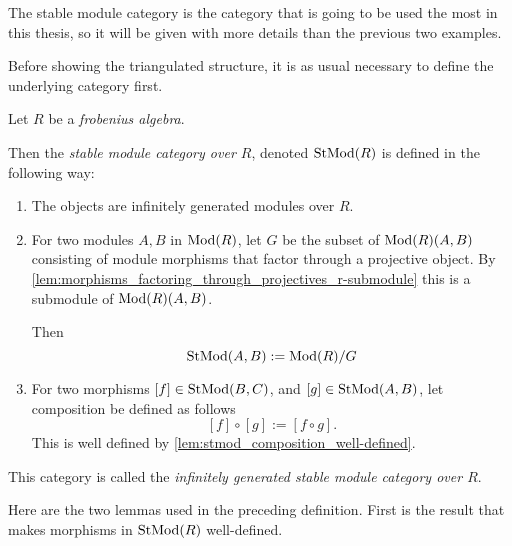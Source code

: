 The stable module category is the category that is going to be used the most in this thesis, so it will be given with more details than the previous two examples.

Before showing the triangulated structure, it is as usual necessary to define the underlying category first.

\begin{definition}
    \label{def:stable_module_category}
    Let \( R \) be a \emph{frobenius algebra}.

    Then the \emph{stable module category over \( R \)}, denoted \( \operatorname{StMod}(R) \) is defined in the following way:
    \begin{enumerate}
        \item {
            The objects are infinitely generated modules over \( R \).
        }
        \item {
            For two modules \( A, B \) in \( \operatorname{Mod}(R) \), let \( G \) be the subset of \( \operatorname{Mod}(R)(A, B) \) consisting of module morphisms that factor through a projective object. By \autoref{lem:morphisms_factoring_through_projectives_r-submodule} this is a submodule of \( \operatorname{Mod}(R)(A, B) \).
            
            Then
            \[
                \operatorname{StMod}(A, B) := \operatorname{Mod}(R)/G
            \]
        }
        \item {
            For two morphisms \( [f] \in \operatorname{StMod}(B, C) \), and \( [g] \in \operatorname{StMod}(A, B) \), let composition be defined as follows
            \[
                [f] \circ [g] := [f \circ g].
            \]
            This is well defined by \autoref{lem:stmod_composition_well-defined}.
        }
    \end{enumerate}

    This category is called the \emph{infinitely generated stable module category over \( R \)}.
\end{definition}

Here are the two lemmas used in the preceding definition. First is the result that makes morphisms in \( \operatorname{StMod}(R) \) well-defined.

